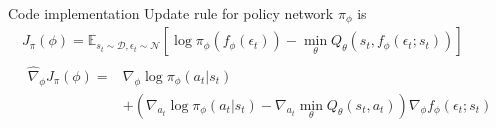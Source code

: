 \documentclass[8pt]{beamer}
\newcommand{\mbb}[1]{\mathbb{#1}}
\begin{document}
\begin{frame}{Code implementation}
    Update rule for policy network $\pi_\phi$ is
    \[
    \begin{gathered}
        J_\pi(\phi) = \mbb{E}_{s_t \sim \mathcal{D}, \epsilon_t \sim \mathcal{N}}[\log{\pi_\phi (f_\phi (\epsilon_t))} - \min_\theta Q_\theta (s_t, f_\phi(\epsilon_t; s_t))] \\
        \begin{aligned}
            \hat{\nabla}_{\phi} J_\pi (\phi) =& \nabla_\phi \log{\pi_\phi (a_t | s_t)}  \\
            &+(\nabla_{a_t} \log{\pi_\phi (a_t |s_t)} - \nabla_{a_t} \min_\theta Q_\theta(s_t, a_t)) \nabla_\phi f_\phi (\epsilon_t; s_t)
        \end{aligned}
    \end{gathered}
    \]


\end{frame}
\end{document}
